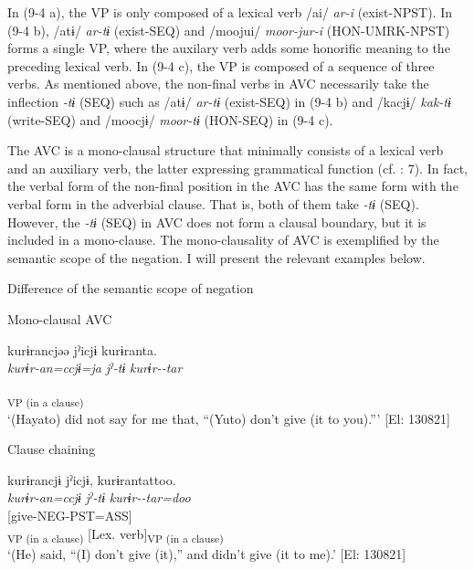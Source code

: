 In (9-4 a), the VP is only composed of a lexical verb /ai/ \textit{ar-i} (exist-NPST). In (9-4 b), /atɨ/ \textit{ar-tɨ} (exist-SEQ) and /moojui/ \textit{moor-jur-i} (HON-UMRK-NPST) forms a single VP, where the auxilary verb adds some honorific meaning to the preceding lexical verb. In (9-4 c), the VP is composed of a sequence of three verbs. As mentioned above, the non-final verbs in AVC necessarily take the inflection \textit{{}-tɨ} (SEQ) such as /atɨ/ \textit{ar-tɨ} (exist-SEQ) in (9-4 b) and /kacjɨ/ \textit{kak-tɨ} (write-SEQ) and /moocjɨ/ \textit{moor-tɨ} (HON-SEQ) in (9-4 c).

  The AVC is a mono-clausal structure that minimally consists of a lexical verb and an auxiliary verb, the latter expressing grammatical function (cf. \citealt{Anderson2006}: 7). In fact, the verbal form of the non-final position in the AVC has the same form with the verbal form in the adverbial clause. That is, both of them take \textit{{}-tɨ} (SEQ). However, the \textit{{}-tɨ} (SEQ) in AVC does not form a clausal boundary, but it is included in a mono-clause. The mono-clausality of AVC is exemplified by the semantic scope of the negation. I will present the relevant examples below.

\ea   Difference of the semantic scope of negation \label{ex:9.5}

  \ea\label{ex:9.5a} Mono-clausal AVC\\

 \gllll  kurɨrancjəə  jˀicjɨ  kurɨranta.\\
    \textit{kurɨr-an=ccjɨ=ja}  \textit{jˀ-tɨ}  \textit{kurɨr--tar}\\
    [give-NEG=QT=TOP  say-SEQ  BEN-NEG-PST]\\
    [Complement  Lex. verb  Aux. verb]\textsubscript{VP (in a clause)}\\
    \glt     ‘(Hayato) did not say for me that, “(Yuto) don’t give (it to you).”’ [El: 130821]

  \ex\label{ex:9.5b} Clause chaining\\

 \gllll  kurɨrancjɨ  jˀicjɨ,  kurɨrantattoo.\\
    \textit{kurɨr-an=ccjɨ}  \textit{jˀ-tɨ}  \textit{kurɨr--tar=doo}\\
    [give-NEG=QT  say-SEQ]  [give-NEG-PST=ASS]\\
    [Complement  Lex. verb]\textsubscript{VP (in a clause)}  [Lex. verb]\textsubscript{VP (in a clause)}\\
    \glt     ‘(He) said, “(I) don’t give (it),” and didn’t give (it to me).’ [El: 130821]
\z
\z

